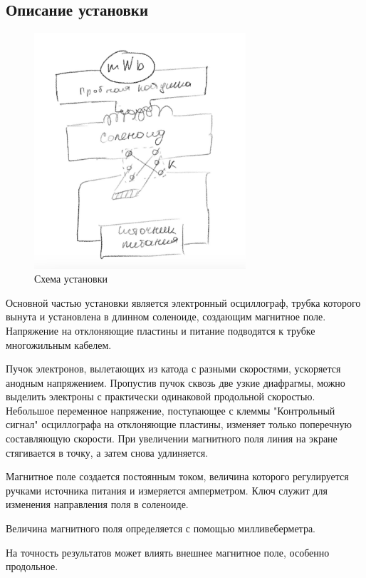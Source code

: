 \documentclass[a4paper, 12pt]{article}
\begin{document}
\subsection{Описание установки}
\begin{figure}[H]
    \centering
    \includegraphics[width=0.7\textwidth]{set}
    \caption{Схема установки}
    \label{fig:set}
\end{figure}
Основной частью установки является электронный осциллограф, трубка которого вынута и установлена в длинном соленоиде, создающим магнитное поле. Напряжение на отклоняющие пластины и питание подводятся к трубке многожильным кабелем.

Пучок электронов, вылетающих из катода с разными скоростями, ускоряется анодным напряжением. Пропустив пучок сквозь две узкие диафрагмы, можно выделить электроны с практически одинаковой продольной скоростью. Небольшое переменное напряжение, поступающее с клеммы "Контрольный сигнал" осциллографа на отклоняющие пластины, изменяет только поперечную составляющую скорости. При увеличении магнитного поля линия на экране стягивается в точку, а затем снова удлиняется. 

Магнитное поле создается постоянным током, величина которого регулируется ручками источника питания и измеряется амперметром. Ключ служит для изменения направления поля в соленоиде.

Величина магнитного поля определяется с помощью милливеберметра.

На точность результатов может влиять внешнее магнитное поле, особенно продольное. 
\end{document}
